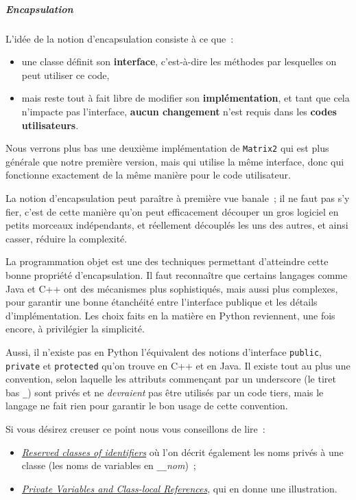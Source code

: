     \hypertarget{encapsulation}{%
\subparagraph{Encapsulation}\label{encapsulation}}

    L'idée de la notion d'encapsulation consiste à ce que~:

\begin{itemize}
\tightlist
\item
  une classe définit son \textbf{interface}, c'est-à-dire les méthodes
  par lesquelles on peut utiliser ce code,
\item
  mais reste tout à fait libre de modifier son \textbf{implémentation},
  et tant que cela n'impacte pas l'interface, \textbf{aucun changement}
  n'est requis dans les \textbf{codes utilisateurs}.
\end{itemize}

    Nous verrons plus bas une deuxième implémentation de \texttt{Matrix2}
qui est plus générale que notre première version, mais qui utilise la
même interface, donc qui fonctionne exactement de la même manière pour
le code utilisateur.

    La notion d'encapsulation peut paraître à première vue banale~; il ne
faut pas s'y fier, c'est de cette manière qu'on peut efficacement
découper un gros logiciel en petits morceaux indépendants, et réellement
découplés les uns des autres, et ainsi casser, réduire la complexité.

La programmation objet est une des techniques permettant d'atteindre
cette bonne propriété d'encapsulation. Il faut reconnaître que certains
langages comme Java et C++ ont des mécanismes plus sophistiqués, mais
aussi plus complexes, pour garantir une bonne étanchéité entre
l'interface publique et les détails d'implémentation. Les choix faits en
la matière en Python reviennent, une fois encore, à privilégier la
simplicité.

Aussi, il n'existe pas en Python l'équivalent des notions d'interface
\texttt{public}, \texttt{private} et \texttt{protected} qu'on trouve en
C++ et en Java. Il existe tout au plus une convention, selon laquelle
les attributs commençant par un underscore (le tiret bas \texttt{\_})
sont privés et ne \emph{devraient} pas être utilisés par un code tiers,
mais le langage ne fait rien pour garantir le bon usage de cette
convention.

Si vous désirez creuser ce point nous vous conseillons de lire~:

\begin{itemize}
\tightlist
\item
  \href{https://docs.python.org/3/reference/lexical_analysis.html\#reserved-classes-of-identifiers}{\emph{Reserved
  classes of identifiers}} où l'on décrit également les noms privés à
  une classe (les noms de variables en \texttt{\_\_}\emph{nom})~;
\item
  \href{https://docs.python.org/3/tutorial/classes.html\#tut-private}{\emph{Private
  Variables and Class-local References}}, qui en donne une illustration.
\end{itemize}

